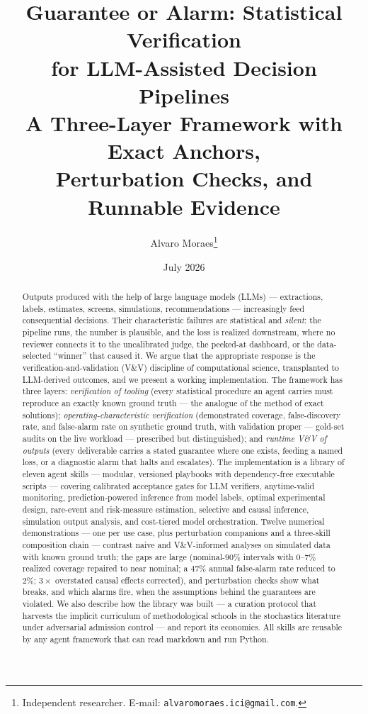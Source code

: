 \documentclass[11pt,a4paper]{article}
\title{Guarantee or Alarm: Statistical Verification\\
for LLM-Assisted Decision Pipelines\\[3pt]
\large A Three-Layer Framework with Exact Anchors,\\
Perturbation Checks, and Runnable Evidence}
\author{Alvaro Moraes\thanks{Independent researcher.
E-mail: \texttt{alvaromoraes.ici@gmail.com}.}}
\date{July 2026}
\begin{document}
\maketitle

\begin{abstract}
Outputs produced with the help of large language models (LLMs) ---
extractions, labels, estimates, screens, simulations, recommendations ---
increasingly feed consequential decisions. Their characteristic failures are
statistical and \emph{silent}: the pipeline runs, the number is plausible,
and the loss is realized downstream, where no reviewer connects it to the
uncalibrated judge, the peeked-at dashboard, or the data-selected
``winner'' that caused it. We argue that the appropriate response is the
verification-and-validation (V\&V) discipline of computational science,
transplanted to LLM-derived outcomes, and we present a working
implementation. The framework has three layers: \emph{verification of
tooling} (every statistical procedure an agent carries must reproduce an
exactly known ground truth --- the analogue of the method of exact
solutions); \emph{operating-characteristic verification} (demonstrated
coverage, false-discovery rate, and false-alarm rate on synthetic ground
truth, with validation proper --- gold-set audits on the live workload ---
prescribed but distinguished); and \emph{runtime V\&V of outputs} (every
deliverable carries a stated guarantee where one exists, feeding a named
loss, or a diagnostic alarm that halts and escalates). The implementation is a library of eleven agent skills ---
modular, versioned playbooks with dependency-free executable scripts ---
covering calibrated acceptance gates for LLM verifiers, anytime-valid
monitoring, prediction-powered inference from model labels, optimal
experimental design, rare-event and risk-measure estimation, selective and
causal inference, simulation output analysis, and cost-tiered model
orchestration. Twelve numerical demonstrations --- one per use case, plus perturbation
companions and a three-skill composition chain --- contrast naive and
V\&V-informed analyses on simulated data with known ground truth; the gaps are large
(nominal-$90\%$ intervals with $0$--$7\%$ realized coverage repaired to
near nominal; a $47\%$ annual false-alarm rate reduced to $2\%$;
$3\times$ overstated causal effects corrected), and perturbation checks
show what breaks, and which alarms fire, when the assumptions behind the
guarantees are violated. We also describe how
the library was built --- a curation protocol that harvests the implicit
curriculum of methodological schools in the stochastics literature under
adversarial admission control --- and report its economics. All skills are
reusable by any agent framework that can read markdown and run Python.
\end{abstract}
\end{document}
